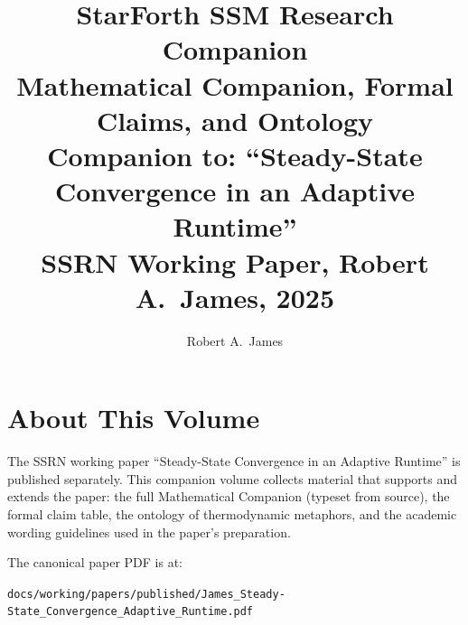 


\title{StarForth SSM Research Companion\\[0.4em]
       \large Mathematical Companion, Formal Claims, and Ontology\\[0.2em]
       \normalsize Companion to: ``Steady-State Convergence in an Adaptive Runtime''\\
       SSRN Working Paper, Robert A.\ James, 2025}
\author{Robert A.\ James}
\date{%
}


\frontmatter
\maketitle

\chapter*{About This Volume}

The SSRN working paper ``Steady-State Convergence in an Adaptive Runtime''
\cite{james:2025:ssrn} is published separately. This companion volume collects
material that supports and extends the paper: the full Mathematical Companion
(typeset from source), the formal claim table, the ontology of thermodynamic
metaphors, and the academic wording guidelines used in the paper's preparation.

The canonical paper PDF is at:
\begin{center}
  \texttt{docs/working/papers/published/James\_Steady-State\_Convergence\_Adaptive\_Runtime.pdf}
\end{center}

\tableofcontents

\mainmatter

